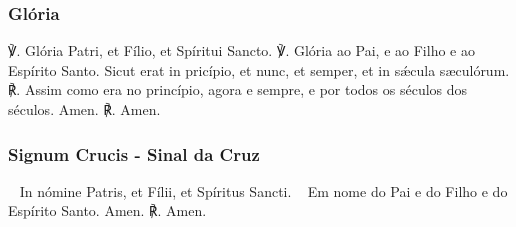 \pagebreak[4]\subsubsection{Glória}
\begin{paracol}{2}
{\redx ℣.} Glória Patri, et Fílio, et Spíritui Sancto.
\switchcolumn
{\redx ℣.} Glória ao Pai, e ao Filho e ao Espírito Santo.
 Sicut erat in pricípio, et nunc, et semper, et in sǽcula sæculórum.
\switchcolumn
{\redx ℟.} Assim como era no princípio, agora e sempre, e por todos os séculos dos
séculos.
 Amen.
\switchcolumn
{\redx ℟.} Amen.
\end{paracol}

\emph{}

\emph{}

\subsubsection{Signum Crucis - Sinal da Cruz}
\begin{paracol}{2}
{\redx ~} In nómine Patris, et Fílii, et Spíritus Sancti.
\switchcolumn
{\redx ~} Em nome do Pai e do Filho e do Espírito Santo.
 Amen.
\switchcolumn
{\redx ℟.} Amen.
\end{paracol}

\emph{}

\mbox{}
\vfill
\begin{nscenter}
\end{nscenter}
